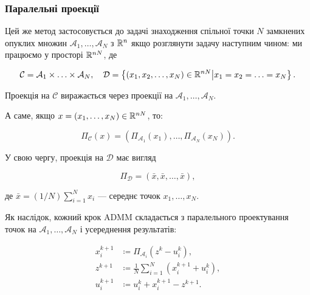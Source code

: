 \subsubsection{Паралельні проекції}

Цей же метод застосовується до задачі знаходження спільної точки $N$ замкнених опуклих множин $\mathcal{A}_1, \ldots, \mathcal{A}_N$ з $\mathbb{R}^n$ якщо розглянути задачу наступним чином: ми працюємо у просторі $\mathbb{R}^{nN}$, де

\begin{equation}
	\mathcal{C} = \mathcal{A}_1 \times \ldots \times \mathcal{A}_N, \quad
	\mathcal{D} = \left\{ (x_1, x_2, \ldots, x_N) \in \mathbb{R}^{nN} \middle| x_1 = x_2 = \ldots = x_N \right\}.
\end{equation}

\begin{proposition}
    Проекція на $\mathcal{C}$ виражається через проекції на $\mathcal{A}_1, \ldots, \mathcal{A}_N$. \medskip

    А саме, якщо $x = (x_1, \ldots, x_N) \in \mathbb{R}^{nN}$, то:

    \begin{equation}
    	\Pi_\mathcal{C}(x) = \left( \Pi_{\mathcal{A}_1} (x_1), \ldots, 
    	\Pi_{\mathcal{A}_N} (x_N) \right).
    \end{equation}
\end{proposition}

\begin{proposition}
    У свою чергу, проекція на $\mathcal{D}$ має вигляд

    \begin{equation}
    	\Pi_\mathcal{D} = \left( \bar x, \bar x, \ldots, \bar x \right),
    \end{equation}
    
    де $\bar x = (1 / N) \sum_{i = 1}^N x_i$ --- середнє точок $x_1, \ldots, x_N$.
\end{proposition}

Як наслідок, кожний крок ADMM складається з паралельного проектування точок на $\mathcal{A}_1, \ldots, \mathcal{A}_N$ і усереднення результатів:

\begin{align}
	x_i^{k + 1} &\coloneqq \Pi_{\mathcal{A}_i} \left(z^k - u_i^k\right), \\
	z^{k + 1} &\coloneqq \frac{1}{N} \sum_{i = 1}^N \left( x_i^{k + 1} + 
	u_i^k \right), \\
	u_i^{k + 1} &\coloneqq u_i^k + x_i^{k + 1} - z^{k + 1}.
\end{align}

